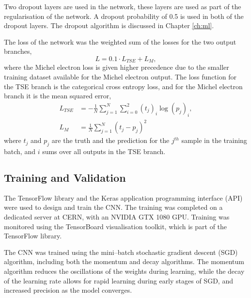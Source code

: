 Two dropout layers are used in the network, these layers are used as part of the
regularisation of the network. A dropout probability of 0.5 is used in both of
the dropout layers. The dropout algorithm is discussed in Chapter \ref{ch:ml}.

The loss of the network was the weighted sum of the losses for the two output
branches,
\begin{equation*}
	L = 0.1 \cdot L_{TSE} + L_M,
\end{equation*}
where the Michel electron loss is given higher precedence due to the smaller
training dataset available for the Michel electron output. The loss function for
the TSE branch is the categorical cross entropy 
loss\cite{750fabedbacb467c8fafd98b87f77436}, and for the Michel electron branch
it is the mean squared error\cite{mse_springer},
\begin{align*}
	L_{TSE} &= - \frac{1}{N} \sum_{j=1}^N \sum_{i=0}^2 (t_j)_i \log (p_j)_i, \\
	L_M &= \frac{1}{N} \sum_{j=1}^N (t_j - p_j)^2
\end{align*}
where $t_j$ and $p_j$ are the truth and the prediction for the $j^{th}$ sample 
in the training batch, and $i$ sums over all outputs in the TSE branch. 

\subsection{Training and Validation}
The TensorFlow\cite{45381} library and the Keras\cite{chollet2015keras} 
application programming interface (API) were used to design and train the CNN. 
The training was completed on a dedicated \protodune{} server at CERN, with an 
NVIDIA GTX 1080 GPU. Training was monitored using the TensorBoard visualisation 
toolkit\cite{tensorboard}, which is part of the TensorFlow library. 

The CNN was trained using the mini--batch stochastic gradient descent (SGD)
algorithm, including both the momentum and decay algorithms\cite{Reed1999}. 
The momentum algorithm reduces the oscillations of the weights during 
learning, while the decay of the learning rate allows for rapid learning 
during early stages of SGD, and increased precision as the model converges. 

